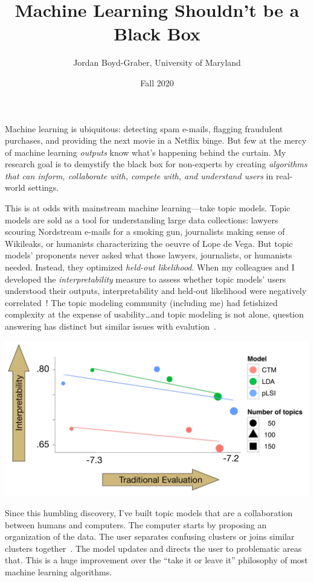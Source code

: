 \documentclass[11pt]{amsart}
\begin{document}
 \title{Machine Learning Shouldn't be a Black Box}

 \author{Jordan Boyd-Graber, University of Maryland}


\date{Fall 2020}

\maketitle

Machine learning is ubiquitous: detecting spam e-mails, flagging fraudulent
purchases, and providing the next movie in a Netflix binge.  But few at
the mercy of machine learning \emph{outputs} know what's happening behind the
curtain.  My research goal is to demystify the black box for non-experts by
creating \emph{algorithms that can inform, collaborate with, compete with, and
  understand users} in real-world settings.

This is at odds with mainstream machine learning---take topic models.  Topic
models are sold as a tool for understanding large data collections: lawyers
scouring Nordstream e-mails for a smoking gun, journalists making sense of Wikileaks,
or humanists characterizing the oeuvre of Lope de Vega.  But topic models'
proponents never asked what those lawyers, journalists, or humanists
needed. Instead, they optimized \emph{held-out likelihood}. When my colleagues
and I developed the \emph{interpretability} measure to assess whether topic
models' users understood their outputs, interpretability and
held-out likelihood were negatively correlated~\cite{chang-09b}! The topic
modeling community (including me) had fetishized complexity at the expense of
usability\dots and topic modeling is not alone, question answering has distinct but similar issues with evalution~\cite{boyd-graber-20}.

\begin{center}
\includegraphics[width=.5\linewidth]{images/prec_ll_4}
\end{center}

Since this humbling discovery, I've built topic models that are a collaboration
between humans and computers.  The computer starts by proposing an organization
of the data.  The user separates confusing clusters or joins
similar clusters together~\cite{hu-14:itm}.  The model updates and directs the user to
problematic areas that.  This is a huge improvement over the
``take it or leave it'' philosophy of most machine learning algorithms.
\end{document}
